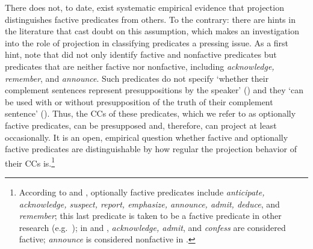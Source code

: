 \documentclass{language}
\newcommand{\6}{\mbox{$[\hspace*{-.6mm}[$}}
\newcommand{\9}{\mbox{$]\hspace*{-.6mm}]$}}
\begin{document}


There does not, to date, exist systematic empirical evidence that projection distinguishes factive predicates from others. To the contrary: there are hints in the literature that cast doubt on this assumption, which makes an investigation into the role of projection in classifying predicates a pressing issue. As a first hint, note that \citealt{kiparsky-kiparsky70} did not only identify factive and nonfactive predicates but predicates that are neither factive nor nonfactive, including {\em acknowledge, remember}, and {\em announce}. Such predicates do not specify `whether their complement sentences represent presuppositions by the speaker' (\citealt[164]{kiparsky-kiparsky70}) and they `can be used with or without presupposition of the truth of their complement sentence' (\citealt[340]{karttunen71-implicative}). Thus, the CCs of these predicates, which we refer to as {\sc optionally factive} predicates, can be presupposed and, therefore, can project at least occasionally. It is an open, empirical question whether factive and optionally factive predicates are distinguishable by how regular the projection behavior of their CCs is.\footnote{According to \citealt{kiparsky-kiparsky70} and \citealt{karttunen71-implicative}, optionally factive predicates include {\em anticipate, acknowledge, suspect, report, emphasize, announce, admit, deduce}, and {\em remember}; this last predicate is taken to be a factive predicate in other research (e.g.\ \citealt{simons07,kastner2015,abrusan2016,karttunen2016,aravind-hackl2017,cremers2018}); in \citealt{karttunen-zaenen2005} and \citealt{karttunen2016}, {\em acknowledge, admit}, and {\em confess} are considered factive; {\em announce} is considered nonfactive in \citealt{karttunen-zaenen2005}.}
\end{document}
